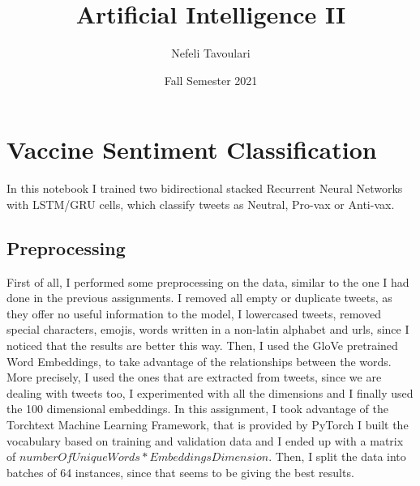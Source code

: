\documentclass{article}
\title{\Huge Artificial Intelligence II}
\author{\LARGE Nefeli Tavoulari}
\date{\LARGE Fall Semester 2021}
\begin{document}
\maketitle

\section{Vaccine Sentiment Classification}
In this notebook I trained two bidirectional stacked Recurrent Neural Networks with LSTM/GRU cells, which classify tweets as Neutral, Pro-vax or Anti-vax.

\subsection{Preprocessing}
First of all, I performed some preprocessing on the data, similar to the one I had done in the previous assignments. I removed all empty or duplicate tweets, as they offer no useful information to the model, I lowercased tweets, removed special characters, emojis, words written in a non-latin alphabet and urls, since I noticed that the results are better this way. Then, I used the GloVe pretrained Word Embeddings, to take advantage of the relationships between the words. More precisely, I used the ones that are extracted from tweets, since we are dealing with tweets too, I experimented with all the dimensions and I finally used the 100 dimensional embeddings. In this assignment, I took advantage of the Torchtext Machine Learning Framework, that is provided by PyTorch I built the vocabulary based on training and validation data and I
ended up with a matrix of $numberOfUniqueWords*EmbeddingsDimension$. Then, I split the data into batches of 64 instances, since that seems to be giving the best results.
\end{document}
